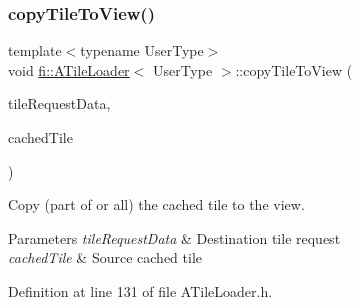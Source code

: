 \subsubsection{\texorpdfstring{copy\+Tile\+To\+View()}{copyTileToView()}}
{\footnotesize\ttfamily template$<$typename User\+Type$>$ \\
void \hyperlink{classfi_1_1ATileLoader}{fi\+::\+A\+Tile\+Loader}$<$ User\+Type $>$\+::copy\+Tile\+To\+View (\begin{DoxyParamCaption}\item[{std\+::shared\+\_\+ptr$<$ \hyperlink{classfi_1_1HTGSTileRequestData}{fi\+::\+H\+T\+G\+S\+Tile\+Request\+Data}$<$ User\+Type $>$$>$}]{tile\+Request\+Data,  }\item[{\hyperlink{classfi_1_1CachedTile}{Cached\+Tile}$<$ User\+Type $>$ $\ast$}]{cached\+Tile }\end{DoxyParamCaption})\hspace{0.3cm}{\ttfamily [inline]}}



Copy (part of or all) the cached tile to the view. 


\begin{DoxyParams}{Parameters}
{\em tile\+Request\+Data} & Destination tile request \\
\hline
{\em cached\+Tile} & Source cached tile \\
\hline
\end{DoxyParams}


Definition at line 131 of file A\+Tile\+Loader.\+h.

